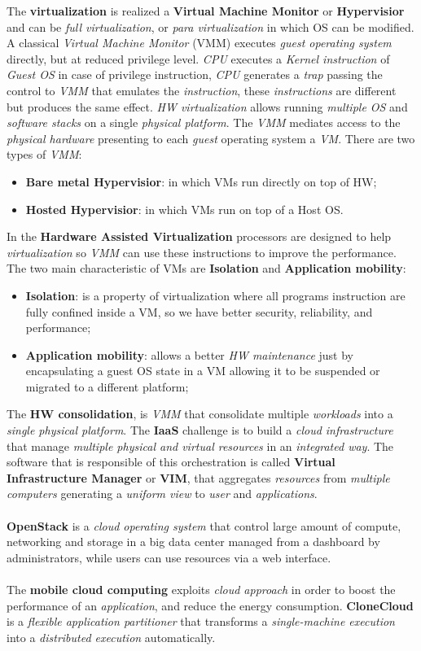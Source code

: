 \documentclass{article}
\begin{document}
The \textbf{virtualization} is realized a \textbf{Virtual Machine Monitor} or \textbf{Hypervisior} and can be \emph{full virtualization}, or \emph{para virtualization} in which OS can be modified. A classical \emph{Virtual Machine Monitor} (VMM) executes \emph{guest operating system} directly, but at reduced privilege level. \emph{CPU} executes a \emph{Kernel instruction} of \emph{Guest OS} in case of privilege instruction, \emph{CPU} generates a \emph{trap} passing the control to \emph{VMM} that emulates the \emph{instruction}, these \emph{instructions} are different but produces the same effect. \emph{HW virtualization} allows running \emph{multiple OS} and \emph{software stacks} on a single\emph{ physical platform}. The \emph{VMM} mediates access to the \emph{physical hardware} presenting to each \emph{guest} operating system a \emph{VM}. There are two types of \emph{VMM}: 
\begin{itemize}
\item \textbf{Bare metal Hypervisior}: in which VMs run directly on top of HW;
\item \textbf{Hosted Hypervisior}: in which VMs run on top of a Host OS. 
\end{itemize}
In the \textbf{Hardware Assisted Virtualization} processors are designed to help \emph{virtualization} so \emph{VMM} can use these instructions to improve the performance. The two main characteristic of VMs are \textbf{Isolation} and \textbf{Application mobility}:
\begin{itemize}
\item \textbf{Isolation}: is a property of virtualization where all programs instruction are fully confined inside a VM, so we have better security, reliability, and performance;
\item \textbf{Application mobility}: allows a better \emph{HW maintenance} just by encapsulating a guest OS state in a VM allowing it to be suspended or migrated to a different platform;
\end{itemize}
The\textbf{ HW consolidation}, is \emph{VMM} that consolidate multiple \emph{workloads} into a \emph{single physical platform}. The \textbf{IaaS} challenge is to build a \emph{cloud infrastructure} that manage \emph{multiple physical and virtual resources} in an \emph{integrated way}. The software that is responsible of this orchestration is called \textbf{Virtual Infrastructure Manager} or \textbf{VIM}, that aggregates \emph{resources} from \emph{multiple computers} generating a \emph{uniform view} to \emph{user} and \emph{applications}.\\\\
\textbf{OpenStack} is a \emph{cloud operating system} that control large amount of compute, networking and storage in a big data center managed from a dashboard by administrators, while users can use resources via a web interface. \\\\
The \textbf{mobile cloud computing} exploits \emph{cloud approach} in order to boost the performance of an \emph{application}, and reduce the energy consumption. \textbf{CloneCloud} is a \emph{flexible application partitioner} that transforms a \emph{single-machine execution} into a \emph{distributed execution} automatically.
\end{document}

